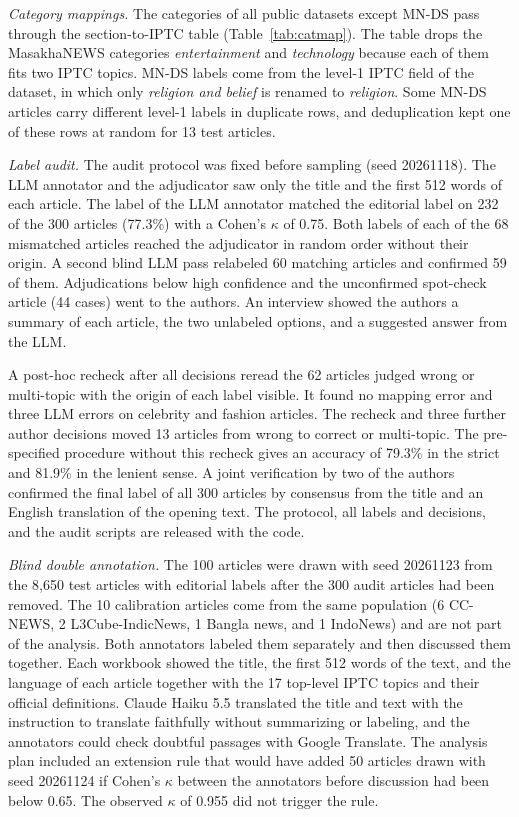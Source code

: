 \documentclass[journal,onecolumn]{IEEEtran}
\begin{document}
\textit{Category mappings.} The categories of all public datasets except MN-DS pass through the section-to-IPTC table (Table~\ref{tab:catmap}). The table drops the MasakhaNEWS categories \emph{entertainment} and \emph{technology} because each of them fits two IPTC topics. MN-DS labels come from the level-1 IPTC field of the dataset, in which only \emph{religion and belief} is renamed to \emph{religion}. Some MN-DS articles carry different level-1 labels in duplicate rows, and deduplication kept one of these rows at random for 13 test articles.

\textit{Label audit.} The audit protocol was fixed before sampling (seed 20261118). The LLM annotator and the adjudicator saw only the title and the first 512 words of each article. The label of the LLM annotator matched the editorial label on 232 of the 300 articles (77.3\%) with a Cohen's $\kappa$ of 0.75. Both labels of each of the 68 mismatched articles reached the adjudicator in random order without their origin. A second blind LLM pass relabeled 60 matching articles and confirmed 59 of them. Adjudications below high confidence and the unconfirmed spot-check article (44 cases) went to the authors. An interview showed the authors a summary of each article, the two unlabeled options, and a suggested answer from the LLM.

A post-hoc recheck after all decisions reread the 62 articles judged wrong or multi-topic with the origin of each label visible. It found no mapping error and three LLM errors on celebrity and fashion articles. The recheck and three further author decisions moved 13 articles from wrong to correct or multi-topic. The pre-specified procedure without this recheck gives an accuracy of 79.3\% in the strict and 81.9\% in the lenient sense. A joint verification by two of the authors confirmed the final label of all 300 articles by consensus from the title and an English translation of the opening text. The protocol, all labels and decisions, and the audit scripts are released with the code.

\textit{Blind double annotation.} The 100 articles were drawn with seed 20261123 from the 8,650 test articles with editorial labels after the 300 audit articles had been removed. The 10 calibration articles come from the same population (6 CC-NEWS, 2 L3Cube-IndicNews, 1 Bangla news, and 1 IndoNews) and are not part of the analysis. Both annotators labeled them separately and then discussed them together. Each workbook showed the title, the first 512 words of the text, and the language of each article together with the 17 top-level IPTC topics and their official definitions. Claude Haiku 5.5 translated the title and text with the instruction to translate faithfully without summarizing or labeling, and the annotators could check doubtful passages with Google Translate. The analysis plan included an extension rule that would have added 50 articles drawn with seed 20261124 if Cohen's $\kappa$ between the annotators before discussion had been below 0.65. The observed $\kappa$ of 0.955 did not trigger the rule.
\end{document}
